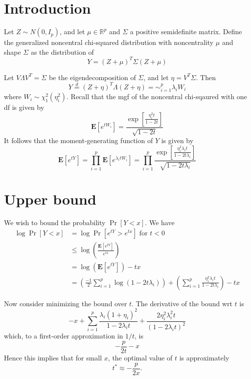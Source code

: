 \documentclass[12pt]{article}
\begin{document}
\maketitle

\newcommand{\tr}{\text{tr}}
\newcommand{\E}{\textbf{E}}
\newcommand{\diag}{\text{diag}}
\newcommand{\argmax}{\text{argmax}}
\newcommand{\Cov}{\text{Cov}}
\newcommand{\Var}{\text{Var}}
\newcommand{\argmin}{\text{argmin}}
\newcommand{\Vol}{\text{Vol}}
\newcommand{\comm}[1]{}

\section{Introduction}

Let $Z \sim N(0, I_p)$, and let $\mu \in \mathbb{R}^p$ and $\Sigma$ a
positive semidefinite matrix.  Define the generalized noncentral
chi-squared distribution with noncentrality $\mu$ and shape $\Sigma$
as the distribution of
\[
Y = (Z + \mu)^T \Sigma (Z + \mu)
\]

Let $V\Lambda V^T = \Sigma$ be the eigendecomposition of $\Sigma$,
and let $\eta = V^T \Sigma$.
Then
\[
Y \stackrel{d}{=} (Z + \eta)^T \Lambda (Z+\eta) = \sim_{i=1}^p \lambda_i W_i
\]
where $W_i \sim \chi^2_1(\eta_i^2)$.
Recall that the mgf of the noncentral chi-sqaured with one df is given by
\[
\E[e^{tW_i}] = \frac{\exp[\frac{\eta_i^2 t}{1-2t}]}{\sqrt{1-2t}}
\]
It follows that the moment-generating function of $Y$ is given by
\[
\E[e^{tY}] = \prod_{i=1}^p \E[e^{\lambda_i t W_i}] = \prod_{i=1}^p \frac{\exp[\frac{\eta_i^2 \lambda_i t}{1-2t \lambda_i}]}{\sqrt{1-2t \lambda_i}}
\]

\section{Upper bound}

We wish to bound the probability $\Pr[Y < x]$.
We have
\begin{align*}
\log \Pr[Y < x] &= \log \Pr[e^{tY} > e^{tx}]\text{ for }t < 0
\\&\leq \log\left(\frac{\E[e^{tY}]}{e^{tx}}\right)
\\&= \log(\E[e^{tY}]) - tx
\\&= \left(\frac{-1}{2} \sum_{i=1}^p \log(1 - 2t\lambda_i)\right) + \left(\sum_{i=1}^p \frac{\eta_i^2 \lambda_i t}{1 - 2t\lambda_i }\right) - tx
\end{align*}

Now consider minimizing the bound over $t$.
The derivative of the bound wrt $t$ is
\[
-x + \sum_{i=1}^p \frac{\lambda_i (1 + \eta_i)^2}{1-2\lambda_i t} + \frac{2\eta_i^2 \lambda_i^2 t}{(1-2\lambda_i t)^2}
\]
which, to a first-order approximation in $1/t$, is
\[
-\frac{p}{2t} - x
\]
Hence this implies that for small $x$, the optimal value of $t$ is approximately
\[
t^* \approx -\frac{p}{2x}.
\]
\end{document}
